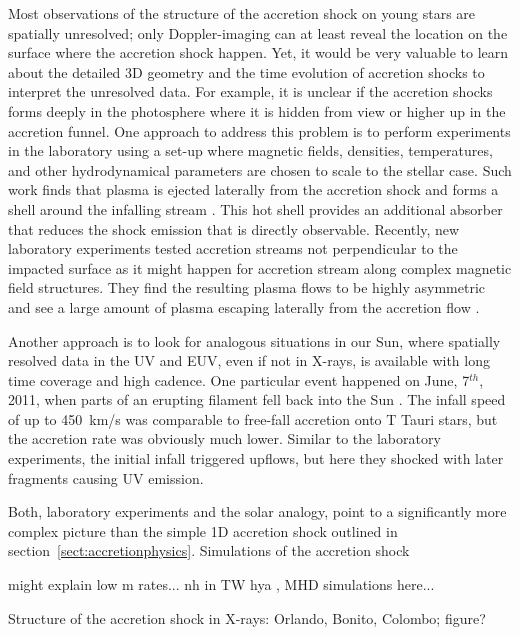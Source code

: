Most observations of the structure of the accretion shock on young stars are spatially unresolved; only Doppler-imaging can at least reveal the location on the surface where the accretion shock happen. Yet, it would be very valuable to learn about the detailed 3D geometry and the time evolution of accretion shocks to interpret the unresolved data. For example, it is unclear if the accretion shocks forms deeply in the photosphere where it is hidden from view or higher up in the accretion funnel. One approach to address this problem is to perform experiments in the laboratory using a set-up where magnetic fields, densities, temperatures, and other hydrodynamical parameters are chosen to scale to the stellar case. Such work finds that plasma is ejected laterally from the accretion shock and forms a shell around the infalling stream \cite{2017SciA....3E0982R} . This hot shell provides an additional absorber that reduces the shock emission that is directly observable. Recently, new laboratory experiments tested accretion streams not perpendicular to the impacted surface as it might happen for accretion stream along complex magnetic field structures. They find the resulting plasma flows to be highly asymmetric and see a large amount of plasma escaping laterally from the accretion flow \cite{2020A&A...642A..38B}.  

Another approach is to look for analogous situations in our Sun, where spatially resolved data in the UV and EUV, even if not in X-rays, is available with long time coverage and high cadence. One particular event happened on June, 7$^{th}$, 2011, when parts of an erupting filament fell back into the Sun \cite{2013Sci...341..251R,2013A&A...559A.127O}. The infall speed of up to 450~km/s was comparable to free-fall accretion onto T Tauri stars, but the accretion rate was obviously much lower. Similar to the laboratory experiments, the initial infall triggered upflows, but here they shocked with later fragments causing UV emission.

Both, laboratory experiments and the solar analogy, point to a significantly more complex picture than the simple 1D accretion shock outlined in section~\ref{sect:accretionphysics}. Simulations of the accretion shock 

might explain low m rates... nh in TW hya , MHD simulations here...

Structure of the accretion shock in X-rays: Orlando, Bonito, Colombo; figure?

